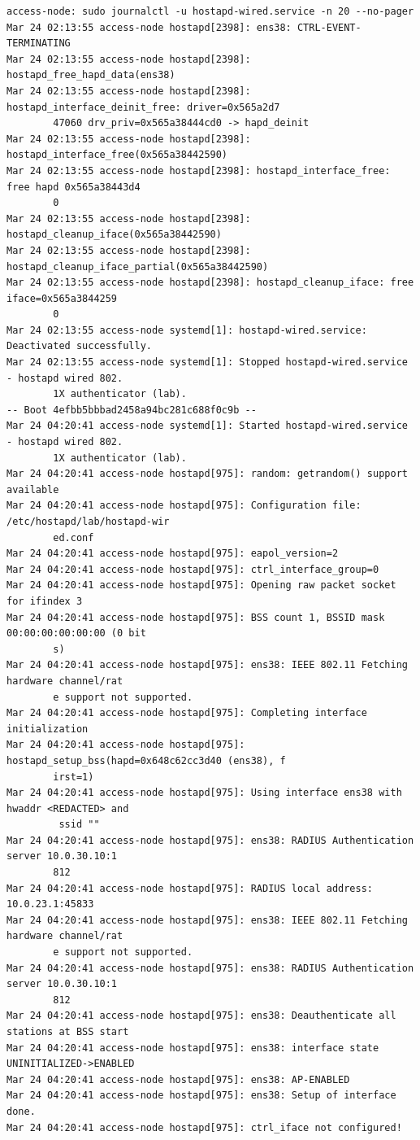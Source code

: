 \documentclass[11pt]{article}
\begin{document}
\begin{verbatim}
access-node: sudo journalctl -u hostapd-wired.service -n 20 --no-pager
Mar 24 02:13:55 access-node hostapd[2398]: ens38: CTRL-EVENT-TERMINATING
Mar 24 02:13:55 access-node hostapd[2398]: hostapd_free_hapd_data(ens38)
Mar 24 02:13:55 access-node hostapd[2398]: hostapd_interface_deinit_free: driver=0x565a2d7
        47060 drv_priv=0x565a38444cd0 -> hapd_deinit
Mar 24 02:13:55 access-node hostapd[2398]: hostapd_interface_free(0x565a38442590)
Mar 24 02:13:55 access-node hostapd[2398]: hostapd_interface_free: free hapd 0x565a38443d4
        0
Mar 24 02:13:55 access-node hostapd[2398]: hostapd_cleanup_iface(0x565a38442590)
Mar 24 02:13:55 access-node hostapd[2398]: hostapd_cleanup_iface_partial(0x565a38442590)
Mar 24 02:13:55 access-node hostapd[2398]: hostapd_cleanup_iface: free iface=0x565a3844259
        0
Mar 24 02:13:55 access-node systemd[1]: hostapd-wired.service: Deactivated successfully.
Mar 24 02:13:55 access-node systemd[1]: Stopped hostapd-wired.service - hostapd wired 802.
        1X authenticator (lab).
-- Boot 4efbb5bbbad2458a94bc281c688f0c9b --
Mar 24 04:20:41 access-node systemd[1]: Started hostapd-wired.service - hostapd wired 802.
        1X authenticator (lab).
Mar 24 04:20:41 access-node hostapd[975]: random: getrandom() support available
Mar 24 04:20:41 access-node hostapd[975]: Configuration file: /etc/hostapd/lab/hostapd-wir
        ed.conf
Mar 24 04:20:41 access-node hostapd[975]: eapol_version=2
Mar 24 04:20:41 access-node hostapd[975]: ctrl_interface_group=0
Mar 24 04:20:41 access-node hostapd[975]: Opening raw packet socket for ifindex 3
Mar 24 04:20:41 access-node hostapd[975]: BSS count 1, BSSID mask 00:00:00:00:00:00 (0 bit
        s)
Mar 24 04:20:41 access-node hostapd[975]: ens38: IEEE 802.11 Fetching hardware channel/rat
        e support not supported.
Mar 24 04:20:41 access-node hostapd[975]: Completing interface initialization
Mar 24 04:20:41 access-node hostapd[975]: hostapd_setup_bss(hapd=0x648c62cc3d40 (ens38), f
        irst=1)
Mar 24 04:20:41 access-node hostapd[975]: Using interface ens38 with hwaddr <REDACTED> and
         ssid ""
Mar 24 04:20:41 access-node hostapd[975]: ens38: RADIUS Authentication server 10.0.30.10:1
        812
Mar 24 04:20:41 access-node hostapd[975]: RADIUS local address: 10.0.23.1:45833
Mar 24 04:20:41 access-node hostapd[975]: ens38: IEEE 802.11 Fetching hardware channel/rat
        e support not supported.
Mar 24 04:20:41 access-node hostapd[975]: ens38: RADIUS Authentication server 10.0.30.10:1
        812
Mar 24 04:20:41 access-node hostapd[975]: ens38: Deauthenticate all stations at BSS start
Mar 24 04:20:41 access-node hostapd[975]: ens38: interface state UNINITIALIZED->ENABLED
Mar 24 04:20:41 access-node hostapd[975]: ens38: AP-ENABLED
Mar 24 04:20:41 access-node hostapd[975]: ens38: Setup of interface done.
Mar 24 04:20:41 access-node hostapd[975]: ctrl_iface not configured!
\end{verbatim}
\end{document}
